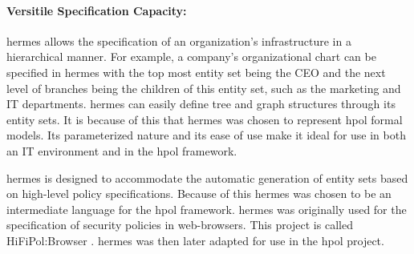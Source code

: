 \documentclass[12pt,letterpaper]{report}
\begin{document}

\paragraph{Versitile Specification Capacity:} \ac{hermes} allows the specification of an organization's infrastructure in a hierarchical manner. For example, a company's organizational chart can be specified in \ac{hermes} with the top most entity set being the CEO and the next level of branches being the children of this entity set, such as the marketing and IT departments. \ac{hermes} can easily define tree and graph structures through its entity sets. It is because of this that \ac{hermes} was chosen to represent \ac{hpol} formal models. Its parameterized nature and its ease of use make it ideal for use in both an IT environment and in the \ac{hpol} framework.


\ac{hermes} is designed to accommodate the automatic generation of entity sets based on high-level policy specifications. Because of this \ac{hermes} was chosen to be an intermediate language for the \ac{hpol} framework. \ac{hermes} was originally used for the specification of security policies in web-browsers. This project is called HiFiPol:Browser \cite{hifipolbro}\cite{Jillepali1}. \ac{hermes} was then later adapted for use in the \ac{hpol} project.
\end{document}
